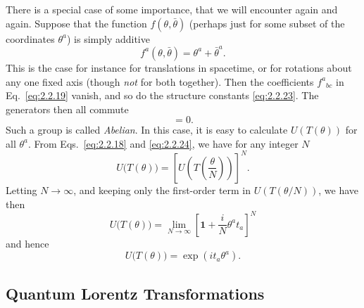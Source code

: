 There is a special case of some importance, that we will encounter again
and again. Suppose that the function $f(\theta,\bar\theta)$ (perhaps just
for some subset of the coordinates $\theta^a$) is simply additive
\begin{equation}
  f^a(\theta,\bar\theta)=\theta^a+\bar\theta^a.
  \tag{2.2.24}\label{eq:2.2.24}
\end{equation}
This is the case for instance for translations in spacetime, or for
rotations about any one fixed axis (though \emph{not} for both together).
Then the coefficients $f^a{}_{bc}$ in Eq.~\eqref{eq:2.2.19} vanish, and so do the
structure constants \eqref{eq:2.2.23}. The generators then all commute
\begin{equation}
  [t_b,t_c]=0.
  \tag{2.2.25}\label{eq:2.2.25}
\end{equation}
Such a group is called \emph{Abelian}. In this case, it is easy to
calculate $U(T(\theta))$ for all $\theta^a$. From Eqs.~\eqref{eq:2.2.18} and
\eqref{eq:2.2.24}, we have for any integer $N$
\begin{equation*}
  U\bigl(T(\theta)\bigr)
    =\left[U\left(T\left(\frac{\theta}{N}\right)\right)\right]^N.
\end{equation*}
Letting $N\to\infty$, and keeping only the first-order term in
$U(T(\theta/N))$, we have then
\begin{equation*}
  U\bigl(T(\theta)\bigr)
    =\lim_{N\to\infty}
      \left[\mathbf{1}+\frac{i}{N}\theta^a t_a\right]^N
\end{equation*}
and hence
\begin{equation}
  U\bigl(T(\theta)\bigr)=\exp(i t_a\theta^a).
  \tag{2.2.26}\label{eq:2.2.26}
\end{equation}

\subsection{Quantum Lorentz Transformations}

